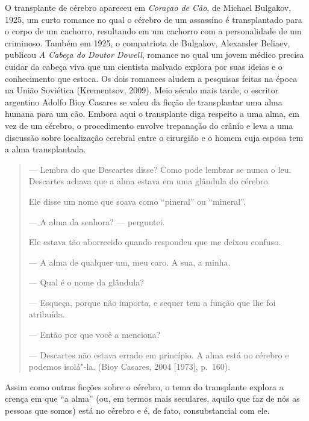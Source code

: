O transplante de cérebro apareceu em \emph{Coraçao de Cão}, de Michael
Bulgakov, 1925, um curto romance no qual o cérebro de um assassino é
transplantado para o corpo de um cachorro, resultando em um cachorro com
a personalidade de um criminoso. Também em 1925, o compatriota de
Bulgakov, Alexander Beliaev, publicou \emph{A Cabeça do Doutor Dowell},
romance no qual um jovem médico precisa cuidar da cabeça viva que um
cientista malvado explora por suas ideias e o conhecimento que estoca.
Os dois romances aludem a pesquisas feitas na época na União Soviética
(Krementsov, 2009). Meio século mais tarde, o escritor argentino Adolfo
Bioy Casares se valeu da ficção de transplantar uma alma humana para um
cão. Embora aqui o transplante diga respeito a uma alma, em vez de um
cérebro, o procedimento envolve trepanação do crânio e leva a uma
discussão sobre localização cerebral entre o cirurgião e o homem cuja
esposa tem a alma transplantada.

\begin{quote}
--- Lembra do que Descartes disse? Como pode lembrar se nunca o leu.
Descartes achava que a alma estava em uma glândula do cérebro.

Ele disse um nome que soava como ``pineral'' ou ``mineral''.

--- A alma da senhora? --- perguntei.

Ele estava tão aborrecido quando respondeu que me deixou confuso.

--- A alma de qualquer um, meu caro. A sua, a minha.

--- Qual é o nome da glândula?

--- Esqueça, porque não importa, e sequer tem a função que lhe foi
atribuída.

--- Então por que você a menciona?

--- Descartes não estava errado em princípio. A alma está no cérebro e
podemos isolá"-la. (Bioy Casares, 2004 {[}1973{]}, p.~160).
\end{quote}

Assim como outras ficções sobre o cérebro, o tema do transplante explora
a crença em que ``a alma'' (ou, em termos mais seculares, aquilo que faz
de nós as pessoas que somos) está no cérebro e é, de fato,
consubstancial com ele.

